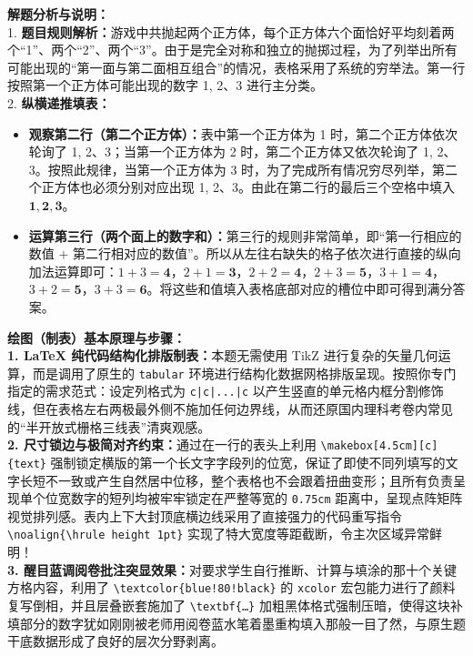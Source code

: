 {\small\color{gray}
\textbf{解题分析与说明：}\\
1. \textbf{题目规则解析：}游戏中共抛起两个正方体，每个正方体六个面恰好平均刻着两个“1”、两个“2”、两个“3”。由于是完全对称和独立的抛掷过程，为了列举出所有可能出现的“第一面与第二面相互组合”的情况，表格采用了系统的穷举法。第一行按照第一个正方体可能出现的数字 1, 2$、$3 进行主分类。\\
2. \textbf{纵横递推填表：}
\begin{itemize}
    \item \textbf{观察第二行（第二个正方体）：}表中第一个正方体为 1 时，第二个正方体依次轮询了 1, 2、3；当第一个正方体为 2 时，第二个正方体又依次轮询了 1, 2、3。按照此规律，当第一个正方体为 3 时，为了完成所有情况穷尽列举，第二个正方体也必须分别对应出现 1, 2$、$3。由此在第二行的最后三个空格中填入 $\boldsymbol{1, 2, 3}$。
    \item \textbf{运算第三行（两个面上的数字和）：}第三行的规则非常简单，即“第一行相应的数值 $+$ 第二行相对应的数值”。所以从左往右缺失的格子依次进行直接的纵向加法运算即可：$1+3=\boldsymbol{4}$，$2+1=\boldsymbol{3}$，$2+2=\boldsymbol{4}$，$2+3=\boldsymbol{5}$，$3+1=\boldsymbol{4}$，$3+2=\boldsymbol{5}$，$3+3=\boldsymbol{6}$。将这些和值填入表格底部对应的槽位中即可得到满分答案。
\end{itemize}
}

\vspace{0.6cm}

{\small\color{blue!70!black}
\textbf{绘图（制表）基本原理与步骤：}\\
\textbf{1. LaTeX 纯代码结构化排版制表：}本题无需使用 TikZ 进行复杂的矢量几何运算，而是调用了原生的 \texttt{tabular} 环境进行结构化数据网格排版呈现。按照你专门指定的需求范式：设定列格式为 \texttt{c|c|...|c} 以产生竖直的单元格内框分割修饰线，但在表格左右两极最外侧不施加任何边界线，从而还原国内理科考卷内常见的“半开放式栅格三线表”清爽观感。\\
\textbf{2. 尺寸锁边与极简对齐约束：}通过在一行的表头上利用 \texttt{\textbackslash makebox[4.5cm][c]\{text\}} 强制锁定横版的第一个长文字字段列的位宽，保证了即使不同列填写的文字长短不一致或产生自然居中位移，整个表格也不会跟着扭曲变形；且所有负责呈现单个位宽数字的短列均被牢牢锁定在严整等宽的 \texttt{0.75cm} 距离中，呈现点阵矩阵视觉排列感。表内上下大封顶底横边线采用了直接强力的代码重写指令 \texttt{\textbackslash noalign\{\textbackslash hrule height 1pt\}} 实现了特大宽度等距截断，令主次区域异常鲜明！\\
\textbf{3. 醒目蓝调阅卷批注突显效果：}对要求学生自行推断、计算与填涂的那十个关键方格内容，利用了 \texttt{\textbackslash textcolor\{blue!80!black\}} 的 \texttt{xcolor} 宏包能力进行了颜料复写倒相，并且层叠嵌套施加了 \texttt{\textbackslash textbf\{\dots\}} 加粗黑体格式强制压暗，使得这块补填部分的数字犹如刚刚被老师用阅卷蓝水笔着墨重构填入那般一目了然，与原生题干底数据形成了良好的层次分野剥离。
}

